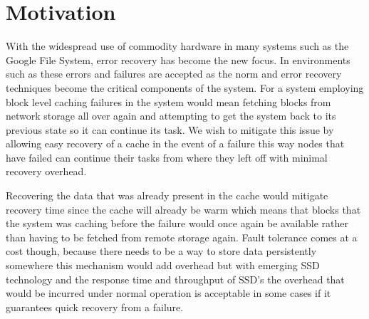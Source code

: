 \section{Motivation}
\label{sec:motivation}

With the widespread use of commodity hardware in many systems such as
the Google File System, error recovery has become the new focus. In
environments such as these errors and failures are accepted as the
norm and error recovery techniques become the critical components of
the system. For a system employing block level caching failures in the
system would mean fetching blocks from network storage all over again
and attempting to get the system back to its previous state so it can
continue its task. We wish to mitigate this issue by allowing easy
recovery of a cache in the event of a failure this way nodes that have
failed can continue their tasks from where they left off with minimal
recovery overhead.

Recovering the data that was already present in the cache would
mitigate recovery time since the cache will already be warm which
means that blocks that the system was caching before the failure would
once again be available rather than having to be fetched from remote
storage again. Fault tolerance comes at a cost though, because there
needs to be a way to store data persistently somewhere this mechanism
would add overhead but with emerging SSD technology and the response
time and throughput of SSD's the overhead that would be incurred under
normal operation is acceptable in some cases if it guarantees quick
recovery from a failure.
